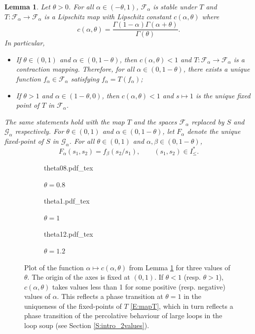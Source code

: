 \documentclass[11pt]{article}
\newtheorem{lemma}[theorem]{Lemma}
\theoremstyle{remark}
\newcommand{\Fc}{\mathcal{F}}
\newcommand{\Gc}{\mathcal{G}}
\numberwithin{equation}{section}
\begin{document}
\begin{lemma}\label{L:fixed-points}
Let $\theta >0$.
For all $\alpha \in (-\theta,1)$, $\Fc_\alpha$ is stable under $T$ and $T : \Fc_\alpha \to \Fc_\alpha$ is a Lipschitz map with Lipschitz constant $c(\alpha,\theta)$ where
\begin{equation}\label{E:L_fixed_point2}
c(\alpha,\theta) = \frac{\Gamma(1-\alpha) \Gamma(\alpha+\theta)}{\Gamma(\theta)}.
\end{equation}
In particular,
\begin{itemize}
\item
If $\theta \in (0,1)$ and $\alpha \in (0,1-\theta)$, then $c(\alpha,\theta) < 1$ and $T : \Fc_\alpha \to \Fc_\alpha$ is a contraction mapping. Therefore, for all $\alpha \in (0,1-\theta)$, there exists a unique function $f_\alpha \in \Fc_\alpha$ satisfying $f_\alpha = T(f_\alpha)$;
\item
If $\theta > 1$ and $\alpha \in (1-\theta, 0)$, then $c(\alpha,\theta) < 1$ and $s \mapsto 1$ is the unique fixed point of $T$ in $\Fc_\alpha$.
\end{itemize}
The same statements hold with the map $T$ and the spaces $\Fc_\alpha$ replaced by $S$ and $\Gc_\alpha$ respectively. For $\theta \in (0,1)$ and $\alpha \in (0,1-\theta)$, let $F_\alpha$ denote the unique fixed-point of $S$ in $\Gc_\alpha$.
For all $\theta \in (0,1)$ and $\alpha, \beta \in (0,1-\theta)$,
\begin{equation}
\label{E:L_fixed_point3}
F_\alpha(s_1,s_2) = f_\beta(s_2/s_1), \quad \quad (s_1,s_2) \in I_\leq^*.
\end{equation}
\end{lemma}

\begin{figure}
   \centering
   \begin{subfigure}{.3\columnwidth}
    \def\svgwidth{\columnwidth}
   {theta08.pdf_tex}
   \caption{$\theta=0.8$}
   \end{subfigure}
   \begin{subfigure}{.3\columnwidth}
    \def\svgwidth{\columnwidth}
   {theta1.pdf_tex}
   \caption{$\theta=1$}
   \end{subfigure}
   \begin{subfigure}{.3\columnwidth}
    \def\svgwidth{\columnwidth}
   {theta12.pdf_tex}
   \caption{$\theta=1.2$}
   \end{subfigure}
\caption{Plot of the function $\alpha \mapsto c(\alpha,\theta)$ from Lemma \ref{L:fixed-points} for three values of $\theta$. The origin of the axes is fixed at $(0,1)$. If $\theta < 1$ (resp. $\theta > 1$), $c(\alpha,\theta)$ takes values less than 1 for some positive (resp. negative) values of $\alpha$. This reflects a phase transition at $\theta = 1$ in the uniqueness of the fixed-points of $T$ \eqref{E:mapT}, which in turn reflects a phase transition of the percolative behaviour of large loops in the loop soup (see Section \ref{S:intro_2values}).}\label{fig1}
\end{figure}
\end{document}
